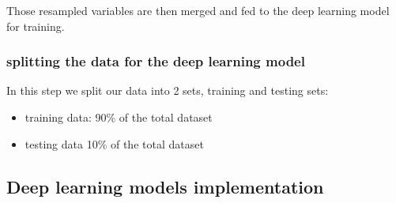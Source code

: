 Those resampled variables are then merged and fed to the deep learning model for training.






\subsubsection{splitting the data for the deep learning model}
In this step we split our data into 2 sets, training and testing sets:
\begin{itemize}
	\item training data: 90\% of the total dataset
	\item testing data 10\% of the total dataset
\end{itemize}






















\subsection{Deep learning models implementation}




